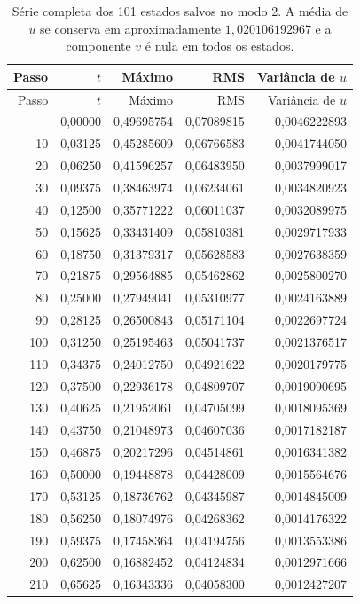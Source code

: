 \begin{longtable}{rrrrr}
\caption{Série completa dos 101 estados salvos no modo 2. A média de $u$ se conserva em aproximadamente $1{,}020106192967$ e a componente $v$ é nula em todos os estados.}\\
\toprule Passo & $t$ & Máximo & RMS & Variância de $u$\\
\midrule\endfirsthead
\toprule Passo & $t$ & Máximo & RMS & Variância de $u$\\
\midrule\endhead
\bottomrule\endfoot
0 & 0,00000 & 0,49695754 & 0,07089815 & 0,0046222893\\
10 & 0,03125 & 0,45285609 & 0,06766583 & 0,0041744050\\
20 & 0,06250 & 0,41596257 & 0,06483950 & 0,0037999017\\
30 & 0,09375 & 0,38463974 & 0,06234061 & 0,0034820923\\
40 & 0,12500 & 0,35771222 & 0,06011037 & 0,0032089975\\
50 & 0,15625 & 0,33431409 & 0,05810381 & 0,0029717933\\
60 & 0,18750 & 0,31379317 & 0,05628583 & 0,0027638359\\
70 & 0,21875 & 0,29564885 & 0,05462862 & 0,0025800270\\
80 & 0,25000 & 0,27949041 & 0,05310977 & 0,0024163889\\
90 & 0,28125 & 0,26500843 & 0,05171104 & 0,0022697724\\
100 & 0,31250 & 0,25195463 & 0,05041737 & 0,0021376517\\
110 & 0,34375 & 0,24012750 & 0,04921622 & 0,0020179775\\
120 & 0,37500 & 0,22936178 & 0,04809707 & 0,0019090695\\
130 & 0,40625 & 0,21952061 & 0,04705099 & 0,0018095369\\
140 & 0,43750 & 0,21048973 & 0,04607036 & 0,0017182187\\
150 & 0,46875 & 0,20217296 & 0,04514861 & 0,0016341382\\
160 & 0,50000 & 0,19448878 & 0,04428009 & 0,0015564676\\
170 & 0,53125 & 0,18736762 & 0,04345987 & 0,0014845009\\
180 & 0,56250 & 0,18074976 & 0,04268362 & 0,0014176322\\
190 & 0,59375 & 0,17458364 & 0,04194756 & 0,0013553386\\
200 & 0,62500 & 0,16882452 & 0,04124834 & 0,0012971666\\
210 & 0,65625 & 0,16343336 & 0,04058300 & 0,0012427207\\

\end{longtable}
